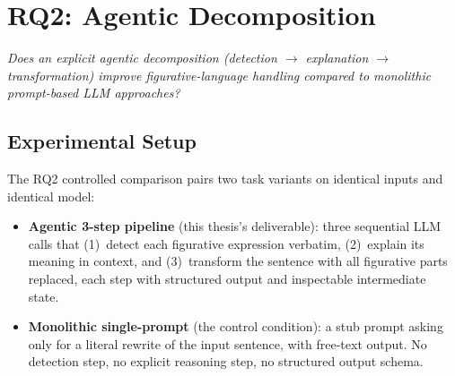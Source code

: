 \section{RQ2: Agentic Decomposition}
\label{sec:rq2}
\textit{Does an explicit agentic decomposition (detection $\to$ explanation $\to$ transformation) improve figurative-language handling compared to monolithic prompt-based LLM approaches?}


\subsection{Experimental Setup}

The RQ2 controlled comparison pairs two task variants on identical inputs and identical model:
\begin{itemize}
    \item \textbf{Agentic 3-step pipeline} (this thesis's deliverable): three sequential LLM calls that (1)~detect each figurative expression verbatim, (2)~explain its meaning in context, and (3)~transform the sentence with all figurative parts replaced, each step with structured output and inspectable intermediate state.
    \item \textbf{Monolithic single-prompt} (the control condition): a stub prompt asking only for a literal rewrite of the input sentence, with free-text output. No detection step, no explicit reasoning step, no structured output schema.
\end{itemize}

